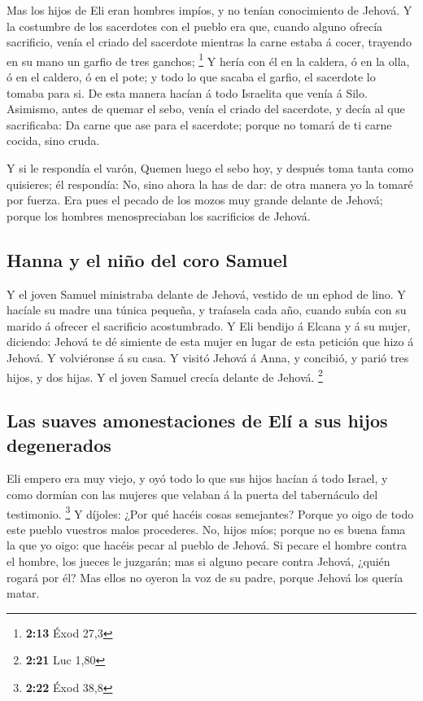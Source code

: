  Mas los hijos de Eli eran hombres impíos, y no tenían
conocimiento de Jehová.  Y la costumbre de los sacerdotes
con el pueblo era que, cuando alguno ofrecía sacrificio, venía el criado
del sacerdote mientras la carne estaba á cocer, trayendo en su mano un
garfio de tres ganchos; \footnote{\textbf{2:13} Éxod 27,3} 
Y hería con él en la caldera, ó en la olla, ó en el caldero, ó en el
pote; y todo lo que sacaba el garfio, el sacerdote lo tomaba para si. De
esta manera hacían á todo Israelita que venía á Silo. 
Asimismo, antes de quemar el sebo, venía el criado del sacerdote, y
decía al que sacrificaba: Da carne que ase para el sacerdote; porque no
tomará de ti carne cocida, sino cruda.

 Y si le respondía el varón, Quemen luego el sebo hoy, y
después toma tanta como quisieres; él respondía: No, sino ahora la has
de dar: de otra manera yo la tomaré por fuerza.  Era pues
el pecado de los mozos muy grande delante de Jehová; porque los hombres
menospreciaban los sacrificios de Jehová.

\hypertarget{hanna-y-el-niuxf1o-del-coro-samuel}{%
\subsection{Hanna y el niño del coro
Samuel}\label{hanna-y-el-niuxf1o-del-coro-samuel}}

 Y el joven Samuel ministraba delante de Jehová, vestido de
un ephod de lino.  Y hacíale su madre una túnica pequeña, y
traíasela cada año, cuando subía con su marido á ofrecer el sacrificio
acostumbrado.  Y Eli bendijo á Elcana y á su mujer,
diciendo: Jehová te dé simiente de esta mujer en lugar de esta petición
que hizo á Jehová. Y volviéronse á su casa.  Y visitó
Jehová á Anna, y concibió, y parió tres hijos, y dos hijas. Y el joven
Samuel crecía delante de Jehová. \footnote{\textbf{2:21} Luc 1,80}

\hypertarget{las-suaves-amonestaciones-de-eluxed-a-sus-hijos-degenerados}{%
\subsection{Las suaves amonestaciones de Elí a sus hijos
degenerados}\label{las-suaves-amonestaciones-de-eluxed-a-sus-hijos-degenerados}}

 Eli empero era muy viejo, y oyó todo lo que sus hijos
hacían á todo Israel, y como dormían con las mujeres que velaban á la
puerta del tabernáculo del testimonio. \footnote{\textbf{2:22} Éxod 38,8}
 Y díjoles: ¿Por qué hacéis cosas semejantes? Porque yo
oigo de todo este pueblo vuestros malos procederes.  No,
hijos míos; porque no es buena fama la que yo oigo: que hacéis pecar al
pueblo de Jehová.  Si pecare el hombre contra el hombre,
los jueces le juzgarán; mas si alguno pecare contra Jehová, ¿quién
rogará por él? Mas ellos no oyeron la voz de su padre, porque Jehová los
quería matar.

